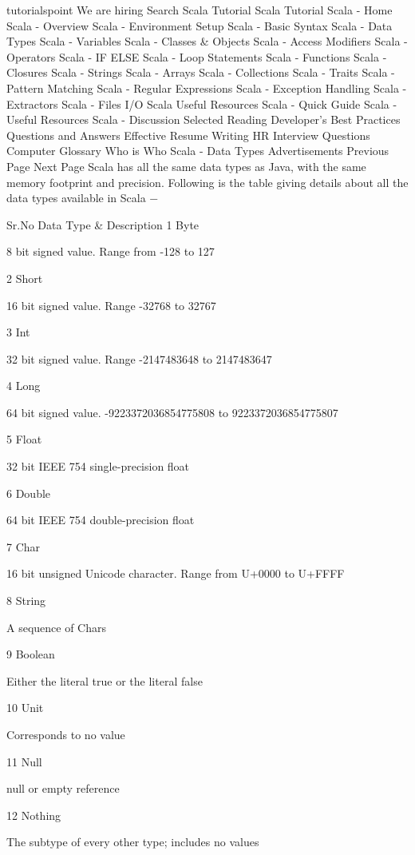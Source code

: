  tutorialspoint
 We are hiring
 Search
Scala Tutorial
Scala Tutorial
Scala - Home
Scala - Overview
Scala - Environment Setup
Scala - Basic Syntax
Scala - Data Types
Scala - Variables
Scala - Classes & Objects
Scala - Access Modifiers
Scala - Operators
Scala - IF ELSE
Scala - Loop Statements
Scala - Functions
Scala - Closures
Scala - Strings
Scala - Arrays
Scala - Collections
Scala - Traits
Scala - Pattern Matching
Scala - Regular Expressions
Scala - Exception Handling
Scala - Extractors
Scala - Files I/O
Scala Useful Resources
Scala - Quick Guide
Scala - Useful Resources
Scala - Discussion
Selected Reading
Developer's Best Practices
Questions and Answers
Effective Resume Writing
HR Interview Questions
Computer Glossary
Who is Who
Scala - Data Types
Advertisements
 Previous Page Next Page  
Scala has all the same data types as Java, with the same memory footprint and precision. Following is the table giving details about all the data types available in Scala −

Sr.No	Data Type & Description
1	
Byte

8 bit signed value. Range from -128 to 127

2	
Short

16 bit signed value. Range -32768 to 32767

3	
Int

32 bit signed value. Range -2147483648 to 2147483647

4	
Long

64 bit signed value. -9223372036854775808 to 9223372036854775807

5	
Float

32 bit IEEE 754 single-precision float

6	
Double

64 bit IEEE 754 double-precision float

7	
Char

16 bit unsigned Unicode character. Range from U+0000 to U+FFFF

8	
String

A sequence of Chars

9	
Boolean

Either the literal true or the literal false

10	
Unit

Corresponds to no value

11	
Null

null or empty reference

12	
Nothing

The subtype of every other type; includes no values

